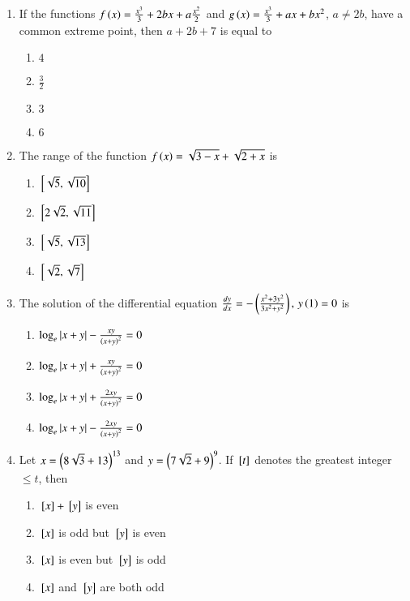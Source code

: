 \documentclass[journal,9pt,onecolumn]{IEEEtran}
\begin{document}
\begin{enumerate}
\item If the functions $f\left(x\right) = \frac{x^3}{3} + 2bx + a\frac{x^2}{2} $ and $g\left(x\right) = \frac{x^3}{3} + ax + bx^2$, $a \neq 2b$, have a common extreme point, then $a + 2b + 7$ is equal to
\begin{multicols}{4}
\begin{enumerate}
    \item $4$
    \item $\frac{3}{2}$
    \item $3$
    \item $6$
\end{enumerate}
\end{multicols}

\item The range of the function $f\left(x\right) = \sqrt{3 - x} + \sqrt{2 + x}$ is
\begin{multicols}{4}
\begin{enumerate}
    \item ${}\left[\sqrt{5}, \sqrt{10}\right]$
    \item ${}\left[2\sqrt{2}, \sqrt{11}\right]$
    \item ${}\left[\sqrt{5}, \sqrt{13}\right]$
    \item ${}\left[\sqrt{2}, \sqrt{7}\right]$
\end{enumerate}
\end{multicols}

\item The solution of the differential equation $ \frac{dy}{dx} = -\left(\frac{x^2 + 3y^2}{3x^2 + y^2}\right), \, y\left(1\right) = 0$  is
\begin{multicols}{2}
\begin{enumerate}
    \item $\log_e \left\vert x + y \right\vert - \frac{xy}{\left( x + y \right)^2} = 0$
    \item $\log_e \left\vert x + y \right\vert + \frac{xy}{\left( x + y \right)^2} = 0$
    \item $\log_e \left\vert x + y \right\vert + \frac{2xy}{\left( x + y \right)^2} = 0$
    \item $\log_e \left\vert x + y \right\vert - \frac{2xy}{\left( x + y \right)^2} = 0$
\end{enumerate}
\end{multicols}

\item Let $x = \left( 8\sqrt{3} + 13\right)^{13}$ and $y = \left(7\sqrt{2} + 9\right)^9$. If ${}\left[t\right]$ denotes the greatest integer $\leq t$, then
\begin{multicols}{2}
\begin{enumerate}
    \item ${}\left[x\right] + {}\left[y\right]$ is even
    \item ${}\left[x\right]$ is odd but ${}\left[y\right]$ is even
    \item ${}\left[x\right]$ is even but ${}\left[y\right]$ is odd
    \item ${}\left[x\right]$ and ${}\left[y\right]$ are both odd
\end{enumerate}
\end{multicols}



\end{enumerate}
\end{document}
